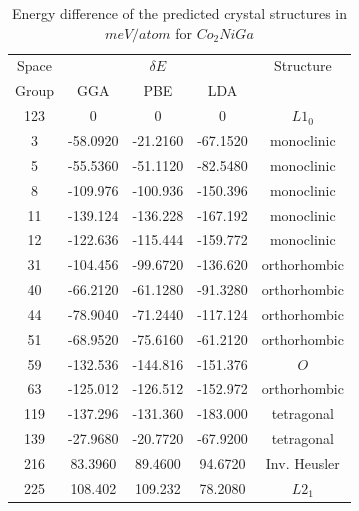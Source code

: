 \documentclass[%
preprint,
 amsmath,amssymb,
 aps,
prb,
showkeys,
]{revtex4-1}
\begin{document}
  \begin{table}
    \caption{Energy difference of the predicted crystal structures in $meV/atom$ for $Co_2NiGa$ }
    \centering
    \setlength{\tabcolsep}{0.8cm}
    \begin{tabular}{c c c c c} 
        \hline \hline
        \multicolumn{1}{c}{Space} & \multicolumn{ 3}{c}{$\delta E$} & \multicolumn{1}{c}{Structure} \\ 
        \multicolumn{1}{c}{Group} & \multicolumn{1}{c}{GGA} & \multicolumn{1}{c}{PBE} & \multicolumn{1}{c}{LDA} &\multicolumn{1}{c}{}\\ 
        \hline
       123 & 0 & 0 & 0 & $ {L1_0}$ \\ 
       3 & -58.0920 & -21.2160& -67.1520 & monoclinic \\ 
       5 & -55.5360 & -51.1120 & -82.5480 & monoclinic \\ 
       8 & -109.976 & -100.936 & -150.396 &  monoclinic \\ 
       11 & -139.124 & -136.228 & -167.192 & monoclinic\\ 
       12 & -122.636 & -115.444 & -159.772  & monoclinic \\ 
       31 & -104.456 & -99.6720  & -136.620 & orthorhombic \\ 
       40 & -66.2120 & -61.1280 & -91.3280 & orthorhombic \\ 
       44 & -78.9040 & -71.2440    & -117.124 & orthorhombic \\ 
       51 & -68.9520 & -75.6160 & -61.2120 & orthorhombic \\ 
       59 &  -132.536 & -144.816 & -151.376 & ${O}$ \\ 
       63 & -125.012 & -126.512 & -152.972 & orthorhombic \\  
       119 &  -137.296 & -131.360  &  -183.000  & tetragonal \\ 
       139 & -27.9680 & -20.7720 & -67.9200  & tetragonal \\ 
       216 & 83.3960 & 89.4600 & 94.6720 & Inv. Heusler\\ 
       225 & 108.402 & 109.232 & 78.2080 & $L2_1$ \\ 
        \hline
      \end{tabular}
    \label{tab:minima_hopping}
    \end{table}
\end{document}
